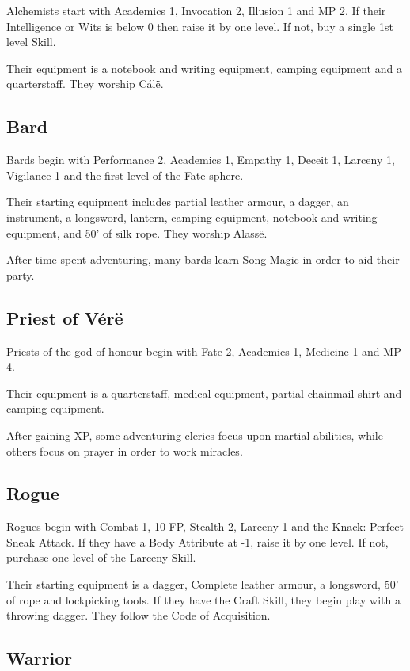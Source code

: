Alchemists start with Academics 1, Invocation 2, Illusion 1 and MP 2.  If their Intelligence or Wits is below 0 then raise it by one level.  If not, buy a single 1st level Skill.

Their equipment is a notebook and writing equipment, camping equipment and a quarterstaff. They worship C\'{a}l\"{e}.

\subsection{Bard}

Bards begin with Performance 2, Academics 1, Empathy 1, Deceit 1, Larceny 1, Vigilance 1 and the first level of the Fate sphere.

Their starting equipment includes partial leather armour, a dagger, an instrument, a longsword, lantern, camping equipment, notebook and writing equipment, and 50' of silk rope.  They worship Alass\"{e}.

After time spent adventuring, many bards learn Song Magic in order to aid their party.

\subsection{Priest of V\'{e}r\"{e}}

Priests of the god of honour begin with Fate 2, Academics 1, Medicine 1 and MP 4.

Their equipment is a quarterstaff, medical equipment, partial chainmail shirt and camping equipment.

After gaining XP, some adventuring clerics focus upon martial abilities, while others focus on prayer in order to work miracles.

\subsection{Rogue}

Rogues begin with Combat 1, 10 FP, Stealth 2, Larceny 1 and the Knack: Perfect Sneak Attack.  If they have a Body Attribute at -1, raise it by one level.  If not, purchase one level of the Larceny Skill.

Their starting equipment is a dagger, Complete leather armour, a longsword, 50' of rope and lockpicking tools.  If they have the Craft Skill, they begin play with a throwing dagger.  They follow the Code of Acquisition.

\subsection{Warrior}

